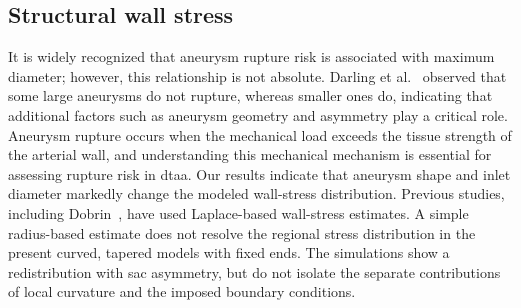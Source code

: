\documentclass[12pt,a4paper]{article}
\newcommand{\cfdrevision}[1]{#1} %
\newcommand{\DTAA}{\ac{dtaa}\xspace}
\theoremstyle{definition}
\numberwithin{equation}{section}
\providecommand{\DIFaddtex}[1]{{\protect\color{blue} \sf #1}} %
\providecommand{\DIFdeltex}[1]{{\protect\color{red} \scriptsize #1}} %
\providecommand{\DIFaddbegin}{} %
\providecommand{\DIFaddend}{} %
\providecommand{\DIFdelbegin}{} %
\providecommand{\DIFdelend}{} %
\providecommand{\DIFadd}[1]{\texorpdfstring{\DIFaddtex{#1}}{#1}} %
\providecommand{\DIFdel}[1]{\texorpdfstring{\DIFdeltex{#1}}{}} %
\newcommand{\DIFscaledelfig}{0.5}
\newlength{\DIFdelgraphicswidth} %
\newlength{\DIFdelgraphicsheight} %
\newcommand{\DIFaddincludegraphics}[2][]{{\color{blue}\fbox{\DIFOincludegraphics[#1]{#2}}}} %
\newcommand{\DIFdelincludegraphics}[2][]{%
\sbox{\DIFdelgraphicsbox}{\DIFOincludegraphics[#1]{#2}}%
\settoboxwidth{\DIFdelgraphicswidth}{\DIFdelgraphicsbox} %
\settoboxtotalheight{\DIFdelgraphicsheight}{\DIFdelgraphicsbox} %
\scalebox{\DIFscaledelfig}{%
\parbox[b]{\DIFdelgraphicswidth}{\usebox{\DIFdelgraphicsbox}\\[-\baselineskip] \rule{\DIFdelgraphicswidth}{0em}}\llap{\resizebox{\DIFdelgraphicswidth}{\DIFdelgraphicsheight}{%
\setlength{\unitlength}{\DIFdelgraphicswidth}%
\begin{picture}(1,1)%
\thicklines\linethickness{2pt} %
{\color[rgb]{1,0,0}\put(0,0){\framebox(1,1){}}}%
{\color[rgb]{1,0,0}\put(0,0){\line( 1,1){1}}}%
{\color[rgb]{1,0,0}\put(0,1){\line(1,-1){1}}}%
\end{picture}%
}\hspace*{3pt}}} %
} %
\DeclareRobustCommand{\DIFaddbegin}{\DIFOaddbegin \let\includegraphics\DIFaddincludegraphics} %
\DeclareRobustCommand{\DIFaddend}{\DIFOaddend \let\includegraphics\DIFOincludegraphics} %
\DeclareRobustCommand{\DIFdelbegin}{\DIFOdelbegin \let\includegraphics\DIFdelincludegraphics} %
\DeclareRobustCommand{\DIFdelend}{\DIFOaddend \let\includegraphics\DIFOincludegraphics} %
\renewcommand{\DIFaddtex}[1]{{\protect\color{red}#1}}
\renewcommand{\DIFdeltex}[1]{}
\renewcommand{\DIFdel}[1]{}
\renewcommand{\DIFaddincludegraphics}[2][]{\DIFOincludegraphics[#1]{#2}}
\renewcommand{\DIFdelincludegraphics}[2][]{}
\renewcommand{\cfdrevision}[1]{\textcolor{red}{#1}}
\def\DIFaddbegin{}\def\DIFaddend{}%
\def\DIFdelbegin{}\def\DIFdelend{}%
\def\cfdrevision#1{#1}%
\begin{document}
\DIFdelend \subsection{Structural wall stress}
\label{sec:structural}

It is widely recognized that aneurysm rupture risk is associated with maximum diameter; however, this relationship is not absolute. Darling et al.~\cite{darling1977autopsy} observed that some large aneurysms do not rupture, whereas smaller ones do, indicating that additional factors such as aneurysm geometry and asymmetry play a critical role. Aneurysm rupture occurs when the mechanical load exceeds the tissue strength of the arterial wall, and understanding this mechanical mechanism is essential for assessing rupture risk in \DTAA. Our results indicate that aneurysm shape and inlet diameter markedly change the modeled wall-stress distribution. \DIFdelbegin \DIFdel{Previous studies, including those by Dobrin~\mbox{%
\cite{dobrin1989pathophysiology}}\hskip0pt%
, have applied Laplace's law to estimate wall stress. However, Laplace's law predicts the greatest wall stress at the maximum bulge of the aneurysm sac, which is not consistent with the biomechanical behavior observed in aneurysmal geometries. As demonstrated in the present study, the stress distribution within the aneurysm wall is governed by asymmetry and geometric features.
}\DIFdelend \DIFaddbegin \DIFadd{\cfdrevision{Previous studies, including Dobrin~\cite{dobrin1989pathophysiology}, have used Laplace-based wall-stress estimates. A simple radius-based estimate does not resolve the regional stress distribution in the present curved, tapered models with fixed ends. The simulations show a redistribution with sac asymmetry, but do not isolate the separate contributions of local curvature and the imposed boundary conditions.}
}\DIFaddend 
\end{document}
